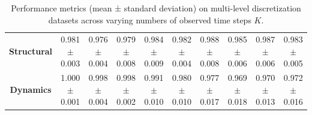 \begin{table}[h!]
\begin{tabular}{|c|ccccccccc|}
\textbf{Structural} & \makecell{0.981\\$\pm$0.003} & \makecell{0.976\\$\pm$0.004} & \makecell{0.979\\$\pm$0.008} & \makecell{0.984\\$\pm$0.009} & \makecell{0.982\\$\pm$0.004} & \makecell{0.988\\$\pm$0.008} & \makecell{0.985\\$\pm$0.006} & \makecell{0.987\\$\pm$0.006} & \makecell{0.983\\$\pm$0.005} \\
\textbf{Dynamics} & \makecell{1.000\\$\pm$0.001} & \makecell{0.998\\$\pm$0.004} & \makecell{0.998\\$\pm$0.002} & \makecell{0.991\\$\pm$0.010} & \makecell{0.980\\$\pm$0.010} & \makecell{0.977\\$\pm$0.017} & \makecell{0.969\\$\pm$0.018} & \makecell{0.970\\$\pm$0.013} & \makecell{0.972\\$\pm$0.016} \\
\hline
\end{tabular}
\caption{Performance metrics (mean ± standard deviation) on multi-level discretization datasets across varying numbers of observed time steps \(K\).}
\label{tab:performance-latest}
\end{table}


